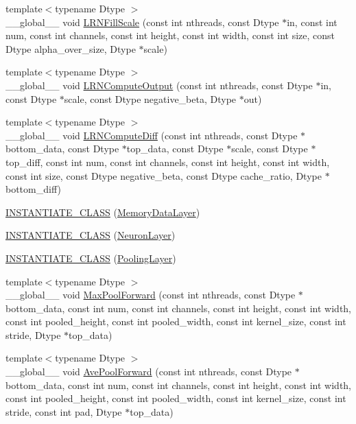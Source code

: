 \begin{DoxyCompactItemize}
{\footnotesize template$<$typename Dtype $>$ }\\\+\_\+\+\_\+global\+\_\+\+\_\+ void \hyperlink{namespacecaffe_a641351385260c312bede8b3fad607507}{L\+R\+N\+Fill\+Scale} (const int nthreads, const Dtype $\ast$in, const int num, const int channels, const int height, const int width, const int size, const Dtype alpha\+\_\+over\+\_\+size, Dtype $\ast$scale)
\item 
{\footnotesize template$<$typename Dtype $>$ }\\\+\_\+\+\_\+global\+\_\+\+\_\+ void \hyperlink{namespacecaffe_a3e2b25f3998a5c8761212e69b9388960}{L\+R\+N\+Compute\+Output} (const int nthreads, const Dtype $\ast$in, const Dtype $\ast$scale, const Dtype negative\+\_\+beta, Dtype $\ast$out)
\item 
{\footnotesize template$<$typename Dtype $>$ }\\\+\_\+\+\_\+global\+\_\+\+\_\+ void \hyperlink{namespacecaffe_af1adaf470bdf0ce07ee640f5b7ada3aa}{L\+R\+N\+Compute\+Diff} (const int nthreads, const Dtype $\ast$bottom\+\_\+data, const Dtype $\ast$top\+\_\+data, const Dtype $\ast$scale, const Dtype $\ast$top\+\_\+diff, const int num, const int channels, const int height, const int width, const int size, const Dtype negative\+\_\+beta, const Dtype cache\+\_\+ratio, Dtype $\ast$bottom\+\_\+diff)
\item 
\hyperlink{namespacecaffe_a760d67cbf4c0daf41b5ea8035455a295}{I\+N\+S\+T\+A\+N\+T\+I\+A\+T\+E\+\_\+\+C\+L\+A\+S\+S} (\hyperlink{classcaffe_1_1_memory_data_layer}{Memory\+Data\+Layer})
\item 
\hyperlink{namespacecaffe_a143812cdb97718180e8ef57f02b08d7c}{I\+N\+S\+T\+A\+N\+T\+I\+A\+T\+E\+\_\+\+C\+L\+A\+S\+S} (\hyperlink{classcaffe_1_1_neuron_layer}{Neuron\+Layer})
\item 
\hyperlink{namespacecaffe_af43ea480985566d99aa40bf8d862830a}{I\+N\+S\+T\+A\+N\+T\+I\+A\+T\+E\+\_\+\+C\+L\+A\+S\+S} (\hyperlink{classcaffe_1_1_pooling_layer}{Pooling\+Layer})
\item 
{\footnotesize template$<$typename Dtype $>$ }\\\+\_\+\+\_\+global\+\_\+\+\_\+ void \hyperlink{namespacecaffe_a9b99970c8e86778efc90dd9e9aaf2b7e}{Max\+Pool\+Forward} (const int nthreads, const Dtype $\ast$bottom\+\_\+data, const int num, const int channels, const int height, const int width, const int pooled\+\_\+height, const int pooled\+\_\+width, const int kernel\+\_\+size, const int stride, Dtype $\ast$top\+\_\+data)
\item 
{\footnotesize template$<$typename Dtype $>$ }\\\+\_\+\+\_\+global\+\_\+\+\_\+ void \hyperlink{namespacecaffe_ae5570ee550fedfed62ebdc91ee33f23b}{Ave\+Pool\+Forward} (const int nthreads, const Dtype $\ast$bottom\+\_\+data, const int num, const int channels, const int height, const int width, const int pooled\+\_\+height, const int pooled\+\_\+width, const int kernel\+\_\+size, const int stride, const int pad, Dtype $\ast$top\+\_\+data)

\end{DoxyCompactItemize}
